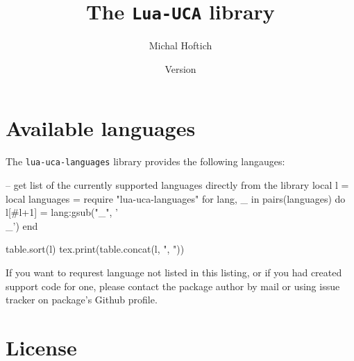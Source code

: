 \documentclass{ltxdoc}
\title{The \texttt{Lua-UCA} library}
\author{Michal Hoftich\authormail{michal.h21@gmail.com}}
\date{Version \version\\\gitdate}
\begin{document}
\maketitle
\tableofcontents
{}

\section{Available languages}

The \texttt{lua-uca-languages} library provides the following langauges:
\bgroup\ttfamily
\begin{luacode*}
-- get list of the currently supported languages directly from the library
local l = {}
local languages = require "lua-uca-languages"
for lang, _ in pairs(languages) do
l[#l+1] = lang:gsub("_", '\\_')
end

table.sort(l)
tex.print(table.concat(l, ", "))
\end{luacode*}
\egroup

If you want to requrest  language not listed in this listing, or if you had
created support code for one, please contact the package author by mail or using
issue tracker on package's Github profile.


\section{License}
\end{document}

